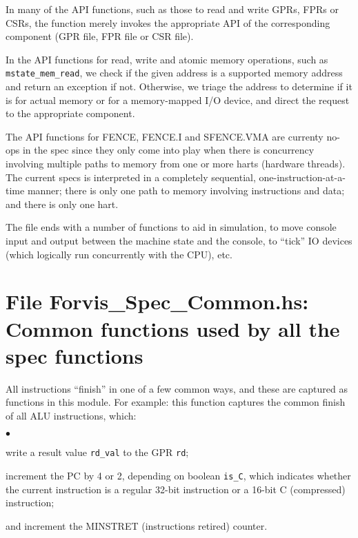 \documentclass[11pt]{article}
\newenvironment{tightlist}%
{\begin{list}{$\bullet$}{%
    \setlength{\topsep}{0in}
    \setlength{\partopsep}{0in}
    \setlength{\itemsep}{0in}
    \setlength{\parsep}{0in}
    \setlength{\leftmargin}{1.5em}
    \setlength{\rightmargin}{0in}
    \setlength{\itemindent}{0in}
}
}%
{\end{list}
}
\begin{document}
In many of the API functions, such as those to read and write GPRs,
FPRs or CSRs, the function merely invokes the appropriate API of the
corresponding component (GPR file, FPR file or CSR file).

In the API functions for read, write and atomic memory operations,
such as \verb|mstate_mem_read|, we check if the given address is a
supported memory address and return an exception if not.  Otherwise,
we triage the address to determine if it is for actual memory or for a
memory-mapped I/O device, and direct the request to the appropriate
component.

The API functions for FENCE, FENCE.I and SFENCE.VMA are currenty
no-ops in the spec since they only come into play when there is
concurrency involving multiple paths to memory from one or more harts
(hardware threads).  The current specs is interpreted in a completely
sequential, one-instruction-at-a-time manner; there is only one path
to memory involving instructions and data; and there is only one hart.

The file ends with a number of functions to aid in simulation, to move
console input and output between the machine state and the console, to
``tick'' IO devices (which logically run concurrently with the CPU), etc.


\section{File Forvis\_Spec\_Common.hs: Common functions used by all the spec functions}

\label{sec_standard_finish_functions}

All instructions ``finish'' in one of a few common ways, and these are
captured as functions in this module.  For example: this function
captures the common finish of all ALU instructions, which:
\begin{tightlist}

\item write a result value \verb|rd_val| to the GPR \verb|rd|;

\item increment the PC by 4 or 2, depending on boolean \verb|is_C|,
which indicates whether the current instruction is a regular 32-bit
instruction or a 16-bit C (compressed) instruction;

\item and increment the MINSTRET (instructions retired) counter.

\end{tightlist}
\end{document}

